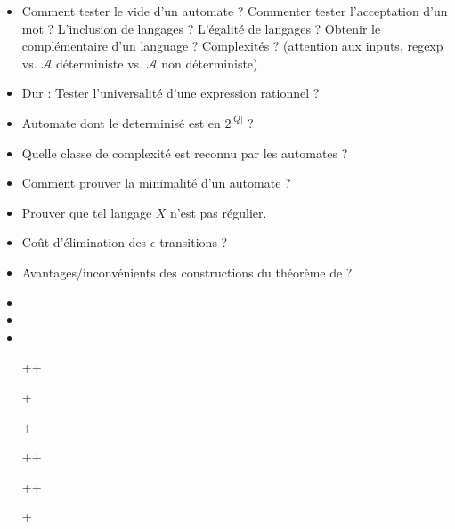 \documentclass{agregfiche}
\begin{document}
\secquestionsclassiques
\begin{itemize}
\item Comment tester le vide d'un automate ? Commenter tester
l'acceptation d'un mot ? L'inclusion de langages ? L'égalité de
langages ? Obtenir le complémentaire d'un language ? Complexités ?
(attention aux inputs, regexp vs. $\mathcal{A}$ déterministe vs.
$\mathcal{A}$ non déterministe)


\item Dur : Tester l'universalité d'une expression rationnel ?
\item Automate dont le determinisé est en $2^{|Q|}$ ?
\item Quelle classe de complexité est reconnu par les automates ?
\item Comment prouver la minimalité d'un automate ?
\item Prouver que tel langage $X$ n'est pas régulier.
\item Coût d'élimination des $\epsilon$-transitions ?
\item Avantages/inconvénients des constructions du théorème de
 ?


\end{itemize}

\secreferences
\begin{itemize}
\item 
\item 
\item 
\end{itemize}

\secdev
\begin{itemize}
\item[++] 
\item[+] 
\item[+] 
\item[++] 
\item[++] 
\item[+] 

\end{itemize}
\end{document}

